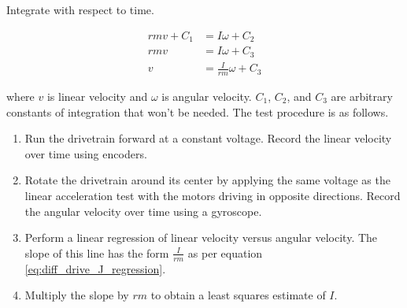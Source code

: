Integrate with respect to time.

\begin{align}
  rmv + C_1 &= I \omega + C_2 \nonumber \\
  rmv &= I \omega + C_3 \nonumber \\
  v &= \frac{I}{rm} \omega + C_3 \label{eq:diff_drive_J_regression}
\end{align}

where $v$ is linear velocity and $\omega$ is angular velocity. $C_1$, $C_2$, and
$C_3$ are arbitrary constants of integration that won't be needed. The test
procedure is as follows.

\begin{enumerate}
  \item Run the drivetrain forward at a constant voltage. Record the linear
    velocity over time using encoders.
  \item Rotate the drivetrain around its center by applying the same voltage as
    the linear acceleration test with the motors driving in opposite directions.
    Record the angular velocity over time using a gyroscope.
  \item Perform a linear regression of linear velocity versus angular velocity.
    The slope of this line has the form $\frac{I}{rm}$ as per equation
    \eqref{eq:diff_drive_J_regression}.
  \item Multiply the slope by $rm$ to obtain a least squares estimate of $I$.
\end{enumerate}
